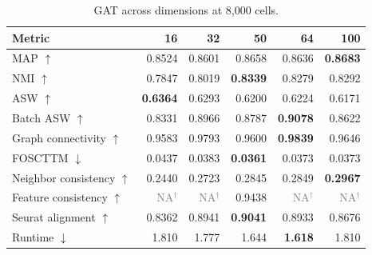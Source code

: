 \documentclass[10pt]{article}
\begin{document}
\begin{table}[H]\centering\scriptsize
\caption{GAT across dimensions at 8,000 cells.}
\begin{tabular}{@{}lrrrrr@{}}\toprule
Metric & 16 & 32 & 50 & 64 & 100 \\\midrule
MAP $\uparrow$ & 0.8524 & 0.8601 & 0.8658 & 0.8636 & \textbf{0.8683} \\
NMI $\uparrow$ & 0.7847 & 0.8019 & \textbf{0.8339} & 0.8279 & 0.8292 \\
ASW $\uparrow$ & \textbf{0.6364} & 0.6293 & 0.6200 & 0.6224 & 0.6171 \\
Batch ASW $\uparrow$ & 0.8331 & 0.8966 & 0.8787 & \textbf{0.9078} & 0.8622 \\
Graph connectivity $\uparrow$ & 0.9583 & 0.9793 & 0.9600 & \textbf{0.9839} & 0.9646 \\
FOSCTTM $\downarrow$ & 0.0437 & 0.0383 & \textbf{0.0361} & 0.0373 & 0.0373 \\
Neighbor consistency $\uparrow$ & 0.2440 & 0.2723 & 0.2845 & 0.2849 & \textbf{0.2967} \\
Feature consistency $\uparrow$ & \textcolor{gray}{NA$^{\dagger}$} & \textcolor{gray}{NA$^{\dagger}$} & 0.9438 & \textcolor{gray}{NA$^{\dagger}$} & \textcolor{gray}{NA$^{\dagger}$} \\
Seurat alignment $\uparrow$ & 0.8362 & 0.8941 & \textbf{0.9041} & 0.8933 & 0.8676 \\
Runtime $\downarrow$ & 1.810 & 1.777 & 1.644 & \textbf{1.618} & 1.810 \\
\bottomrule\end{tabular}\end{table}
\end{document}
